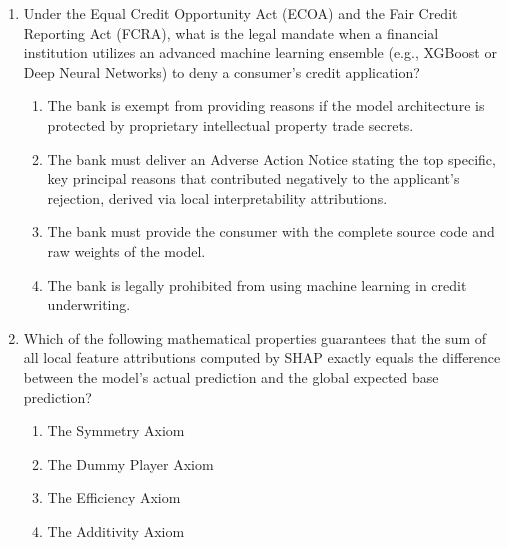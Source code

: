 \begin{enumerate}[label=\textbf{MCQ 12.\arabic*}]
    \item Under the Equal Credit Opportunity Act (ECOA) and the Fair Credit Reporting Act (FCRA), what is the legal mandate when a financial institution utilizes an advanced machine learning ensemble (e.g., XGBoost or Deep Neural Networks) to deny a consumer's credit application?
    \begin{enumerate}[label=(\alph*)]
        \item The bank is exempt from providing reasons if the model architecture is protected by proprietary intellectual property trade secrets.
        \item The bank must deliver an Adverse Action Notice stating the top specific, key principal reasons that contributed negatively to the applicant's rejection, derived via local interpretability attributions.
        \item The bank must provide the consumer with the complete source code and raw weights of the model.
        \item The bank is legally prohibited from using machine learning in credit underwriting.
    \end{enumerate}

    \item Which of the following mathematical properties guarantees that the sum of all local feature attributions computed by SHAP exactly equals the difference between the model's actual prediction and the global expected base prediction?
    \begin{enumerate}[label=(\alph*)]
        \item The Symmetry Axiom
        \item The Dummy Player Axiom
        \item The Efficiency Axiom
        \item The Additivity Axiom
    \end{enumerate}
\end{enumerate}
